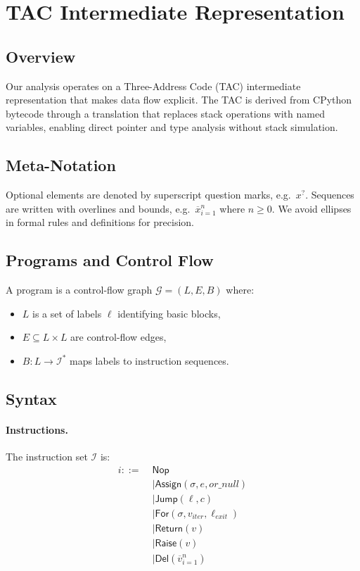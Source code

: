 \section{TAC Intermediate Representation}
\label{appendix:tac-ir}

\subsection{Overview}

Our analysis operates on a Three-Address Code (TAC) intermediate representation that makes data flow explicit.
The TAC is derived from CPython bytecode through a translation that replaces stack operations with named variables, enabling direct pointer and type analysis without stack simulation.

\subsection{Meta-Notation}

Optional elements are denoted by superscript question marks, e.g.\ $x^{?}$.
Sequences are written with overlines and bounds, e.g.\ $\overline{x}_{i=1}^{n}$ where $n \geq 0$.
We avoid ellipses in formal rules and definitions for precision.

\subsection{Programs and Control Flow}

A program is a control-flow graph $\mathcal{G} = (L,E,B)$ where:
\begin{itemize}
\item $L$ is a set of labels $\ell$ identifying basic blocks,
\item $E \subseteq L \times L$ are control-flow edges,
\item $B : L \to \mathcal{I}^*$ maps labels to instruction sequences.
\end{itemize}

\subsection{Syntax}

\paragraph{Instructions.}
The instruction set $\mathcal{I}$ is:
\[
\begin{aligned}
i ::= \;& \mathsf{Nop} \\
  &\mid \mathsf{Assign}(\sigma, e, \mathit{or\_null}) \\
  &\mid \mathsf{Jump}(\ell, c) \\
  &\mid \mathsf{For}(\sigma, v_{\mathit{iter}}, \ell_{\mathit{exit}}) \\
  &\mid \mathsf{Return}(v) \\
  &\mid \mathsf{Raise}(v) \\
  &\mid \mathsf{Del}(\overline{v}_{i=1}^{n})
\end{aligned}
\]

